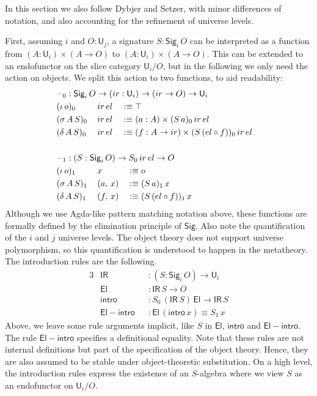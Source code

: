\documentclass[acmsmall,screen,review,anonymous]{acmart}
\newcommand{\msf}[1]{{\mathsf{#1}}}
\newcommand{\U}{\msf{U}}
\newcommand{\El}{\msf{El}}
\newcommand{\Sig}{\msf{Sig}}
\newcommand{\blank}{{\mathord{\hspace{1pt}\text{--}\hspace{1pt}}}}
\newcommand{\ir}{{ir}}
\newcommand{\el}{{el}}
\newcommand{\IR}{\msf{IR}}
\newcommand{\intro}{\msf{intro}}
\begin{document}
In this section we also follow Dybjer and Setzer, with minor differences of notation, and also
accounting for the refinement of universe levels.

First, assuming $i$ and $O : \U_j$, a signature $S : \Sig_i\,O$ can be interpreted as a function
from $(A : \U_i) \times (A \to O)$ to $(A : \U_i) \times (A \to O)$. This can be extended to an
endofunctor on the slice category $\U_i/O$, but in the following we only need the action on
objects. We split this action to two functions, to aid readability:
\begin{alignat*}{3}
  &\rlap{$\blank_0 : \Sig_i\,O \to (\ir : \U_i) \to (\ir \to O) \to \U_i$} \\
  &(\iota\,o)_0    \,&&\ir\,\el && \hspace{-0.7em}:\equiv \top\\
  &(\sigma\,A\,S)_0\,&&\ir\,\el && \hspace{-0.7em}:\equiv (a : A) \times (S\,a)_0\,\ir\,\el\\
  &(\delta\,A\,S)_0\,&&\ir\,\el && \hspace{-0.7em}:\equiv (f : A \to \ir) \times (S\,(\el \circ f))_0\,\ir\,\el\\
  & && &&\\
  &\rlap{$\blank_1 : (S : \Sig_i\,O) \to S_0\,\ir\,\el \to O$} \\
  &(\iota\,o)_1    \,&&x       && :\equiv o\\
  &(\sigma\,A\,S)_1\,&&(a,\,x) && :\equiv (S\,a)_1\,x\\
  &(\delta\,A\,S)_1\,&&(f,\,x) && :\equiv (S\,(\el \circ f))_1\,x
\end{alignat*}
Although we use Agda-like pattern matching notation above, these functions are formally defined by
the elimination principle of $\Sig$. Also note the quantification of the $i$ and $j$ universe
levels. The object theory does not support universe polymorphism, so this quantification is
understood to happen in the metatheory. The introduction rules are the following.
\begin{alignat*}{3}
  &\IR                && : (S : \Sig_i\,O) \to \U_i\\
  &\El                && : \IR\,S \to O\\
  &\intro             && : S_0\,(\IR\,S)\,\El \to \IR\,S\\
  &\msf{El\!\!-\!\!intro} && : \El\,(\intro\,x) \equiv S_1\,x
\end{alignat*}
Above, we leave some rule arguments implicit, like $S$ in $\El$, $\intro$ and
$\msf{El\!\!-\!\!intro}$. The rule $\msf{El\!\!-\!\!intro}$ specifies a definitional equality.  Note
that these rules are not internal definitions but part of the specification of the object
theory. Hence, they are also assumed to be stable under object-theoretic substitution. On a high
level, the introduction rules express the existence of an $S$-algebra where we view $S$ as an
endofunctor on $\U_i/O$.
\end{document}
